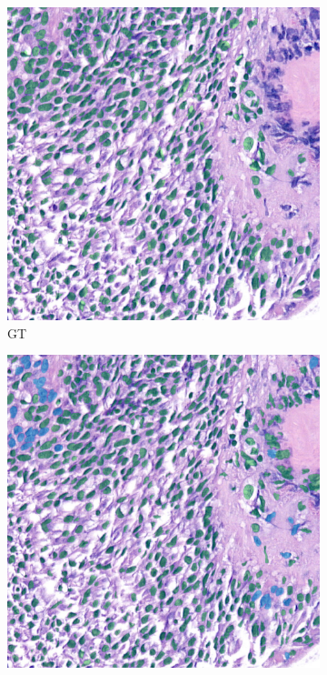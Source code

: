\begin{figure}[H]
    \centering
    \begin{subfigure}[b]{0.3\textwidth}
    \includegraphics[width=\textwidth]{imgs/qual/lung/context-gt.overlay.png}
    \caption{GT}
  \end{subfigure}
  \begin{subfigure}[b]{0.3\textwidth}
    \includegraphics[width=\textwidth]{imgs/qual/lung/context-hov.png}

\end{subfigure}
\end{figure}
